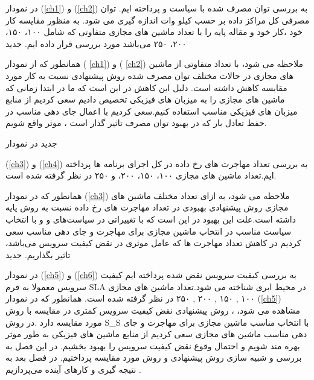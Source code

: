 در نمودار
(\ref{ch1})
و
(\ref{ch2})
به بررسی توان مصرف شده با سیاست
و
 پرداخته ایم. توان مصرفی کل مراکز داده بر حسب کیلو وات اندازه گیری می شود. به منظور مقایسه کار خود ،کار خود و مقاله پایه را با تعداد ماشین های مجازی متفاوتی که شامل ۱۰۰، ۱۵۰، ۲۰۰، ۲۵۰  می‌باشد مورد بررسی قرار داده ایم.
‌جدید
 
 
  همانطور که از نمودار
( \ref{ch1})
 و
( \ref{ch2})
  ملاحظه می شود، با تعداد متفاوتی از ماشین های مجازی در حالات مختلف توان مصرف شده روش پیشنهادی نسبت به کار مورد مقایسه کاهش داشته است. دلیل این کاهش در این است که ما در ابتدا زمانی که ماشین های مجازی را به میزبان های فیزیکی تخصیص دادیم سعی کردیم از منابع میزبان های فیزیکی مناسب استفاده کنیم.سعی کردیم با اعمال جای دهی مناسب در حفظ تعادل بار که در بهبود توان مصرف تاثیر گذار است  ، موثر واقع شویم.

‌جدید 
در نمودار
	
		
(\ref{ch3})
و
(\ref{ch4})
به بررسی تعداد مهاجرت های رخ داده در کل اجرای برنامه ها  پرداخته ایم.تعداد ماشین های مجازی ۱۰۰، ۱۵۰، ۲۰۰، و ۲۵۰ در نظر گرفته شده است. 

همانطور که در نمودار 
(\ref{ch3})
 ملاحظه می شود، به ازای تعداد مختلف ماشین های مجازی روش پیشنهادی بهبودی در تعداد مهاجرت های رخ داده نسبت به روش پایه داشته است.علت این بهبود در این است که با تغییراتی در سیاست‌های 
 و
 و با
  انتخاب سیاست مناسب در انتخاب ماشین مجازی برای مهاجرت و جای دهی مناسب سعی کردیم در کاهش تعداد مهاجرت ها که عامل موثری در نقض کیفیت سرویس می‌باشد، تاثیر بگذاریم.
‌جدید


 در نمودار
(\ref{ch5})
و
(\ref{ch6})
 به بررسی کیفیت سرویس نقض شده پرداخته ایم کیفیت سرویس معمولا به فرم  SLA در محیط ابری شناخته می شود.تعداد ماشین های مجازی
۱۰۰
,
۱۵۰
,
۲۰۰
,
۲۵۰
  در نظر گرفته شده است.
همانطور که در نمودار
(\ref{ch5})
مشاهده می شود، ­، روش پیشنهادی نقض کیفیت سرویس کمتری در مقایسه با روش مورد مقایسه دارد .در روش S\_S با انتخاب مناسب ماشین مجازی برای مهاجرت و جای دهی مناسب ماشین های مجازی سعی کردیم از منابع ماشین های فیزیکی به طور موثر بهره مند شویم و احتمال وقوع نقض کیفیت سرویس  را بهبود بخشیم. 
در این فصل به بررسی و شبیه سازی روش پیشنهادی  و روش مورد مقایسه پرداختیم. در فصل بعد به نتیجه گیری  و کارهای آینده می‌پردازیم .
